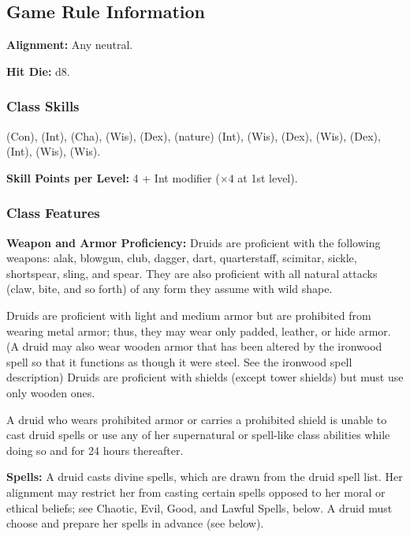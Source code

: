\subsection{Game Rule Information}

\textbf{Alignment:} Any neutral.

\textbf{Hit Die:} d8.

\subsubsection{Class Skills}
 (Con),  (Int),  (Cha),  (Wis),  (Dex),  (nature) (Int),  (Wis),  (Dex),  (Wis),  (Dex),  (Int),  (Wis),  (Wis).

\textbf{Skill Points per Level:} 4 + Int modifier ($\times4$ at 1st level).

\subsubsection{Class Features}

\textbf{Weapon and Armor Proficiency:} Druids are proficient with the following weapons: alak, blowgun, club, dagger, dart, quarterstaff, scimitar, sickle, shortspear, sling, and spear. They are also proficient with all natural attacks (claw, bite, and so forth) of any form they assume with wild shape.

Druids are proficient with light and medium armor but are prohibited from wearing metal armor; thus, they may wear only padded, leather, or hide armor. (A druid may also wear wooden armor that has been altered by the ironwood spell so that it functions as though it were steel. See the ironwood spell description) Druids are proficient with shields (except tower shields) but must use only wooden ones.

A druid who wears prohibited armor or carries a prohibited shield is unable to cast druid spells or use any of her supernatural or spell-like class abilities while doing so and for 24 hours thereafter.

\textbf{Spells:} A druid casts divine spells, which are drawn from the druid spell list. Her alignment may restrict her from casting certain spells opposed to her moral or ethical beliefs; see Chaotic, Evil, Good, and Lawful Spells, below. A druid must choose and prepare her spells in advance (see below).


